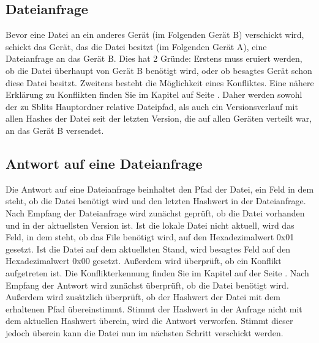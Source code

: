 \subsection{Dateianfrage}
Bevor eine Datei an ein anderes Gerät (im Folgenden Gerät B) verschickt wird, schickt das Gerät, das die Datei besitzt (im Folgenden Gerät A), eine Dateianfrage an das Gerät B. Dies hat 2 Gründe: Erstens muss eruiert werden, ob die Datei überhaupt von Gerät B benötigt wird, oder ob besagtes Gerät schon diese Datei besitzt. Zweitens besteht die Möglichkeit eines Konfliktes. Eine nähere Erklärung zu Konflikten finden Sie im Kapitel  auf Seite \pageref{Konflikt}. Daher werden sowohl der zu Sblits Hauptordner relative Dateipfad, als auch ein Versionsverlauf mit allen Hashes der Datei seit der letzten Version, die auf allen Geräten verteilt war, an das Gerät B versendet. 

\subsection{Antwort auf eine Dateianfrage}
Die Antwort auf eine Dateianfrage beinhaltet den Pfad der Datei, ein Feld in dem steht, ob die Datei benötigt wird und den letzten Hashwert in der Dateianfrage. Nach Empfang der Dateianfrage wird zunächst geprüft, ob die Datei vorhanden und in der aktuellsten Version ist.  Ist die lokale Datei nicht aktuell, wird das Feld, in dem steht, ob das File benötigt wird, auf den Hexadezimalwert 0x01 gesetzt. Ist die Datei auf dem aktuellsten Stand, wird besagtes Feld auf den Hexadezimalwert 0x00 gesetzt. Außerdem wird überprüft, ob ein Konflikt aufgetreten ist. Die Konflikterkennung finden Sie im Kapitel  auf der Seite \pageref{Konflikterkennung}.
Nach Empfang der Antwort wird zunächst überprüft, ob die Datei benötigt wird. Außerdem wird zusätzlich überprüft, ob der Hashwert der Datei mit dem erhaltenen Pfad übereinstimmt. Stimmt der Hashwert in der Anfrage nicht mit dem aktuellen Hashwert überein, wird die Antwort verworfen. Stimmt dieser jedoch überein kann die Datei nun im nächsten Schritt verschickt werden.

